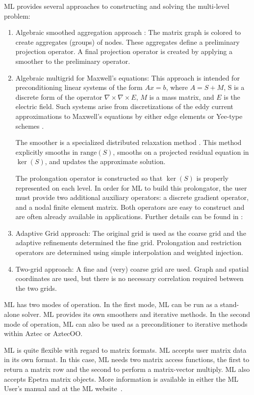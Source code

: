 \documentclass[acmtoms,acmnow]{acmtrans2m}
\begin{document}
ML provides several approaches to constructing and solving the multi-level
problem:
\begin{enumerate}
\item Algebraic smoothed aggregation approach \cite{Vanek:96,Vanek:98}:  The
 matrix graph is colored to create aggregates (groups) of nodes.
These aggregates define a preliminary projection operator.
A final projection operator is created by applying a smoother to the
 preliminary operator.
%
\item Algebraic multigrid for Maxwell's equations:
 This approach is
intended for preconditioning linear systems of the form $Ax=b$, where $A=S+M$,
S is a discrete form of the operator $\nabla\times\nabla\times E$,
 $M$ is a mass matrix, and $E$ is the electric field.
Such systems arise from discretizations of the eddy current approximations to
Maxwell's equations by either edge elements or Yee-type schemes
\cite{Bochev:03a,Yee:66}.

The smoother is a specialized distributed relaxation method \cite{Bochev:03a}.
This method explicitly smooths in $\mbox{range}(S)$, smooths on a projected
 residual
equation in $\ker(S)$, and updates the approximate solution.

The prolongation operator is constructed so that $\ker(S)$ is properly
 represented on each level.
In order for ML to build this prolongator, the user must provide two
additional auxiliary operators: a discrete gradient operator, and a nodal
 finite element matrix.
Both operators are easy to construct and are often already available in
 applications.
Further details can be found in \cite{Bochev:03a,Bochev:03b}:
%
\item Adaptive Grid approach: The original grid is used as the coarse grid and
the adaptive refinements determined the fine grid.
Prolongation and restriction operators are determined using simple interpolation
and weighted injection.
%
\item Two-grid approach: A fine and (very) coarse grid are used.
Graph and spatial coordinates are used, 
but there is no necessary correlation required between the two grids.
\end{enumerate}

ML has two modes of operation.
In the first mode, ML can be run as a stand-alone solver.
ML provides its own smoothers and iterative methods.
In the second mode of operation,
ML can also be used as a preconditioner to iterative methods within Aztec
 or AztecOO.

ML is quite flexible with regard to matrix formats.
ML accepts user matrix data in its own format.
In this case, ML needs two matrix access functions, the first to return
a matrix row and the second to perform a matrix-vector multiply.
ML also accepts Epetra matrix objects.
More information is available in either the ML User's manual
\cite{TuminaroTong:00a} and at the ML website~\cite{ML-home-page}.
\end{document}
